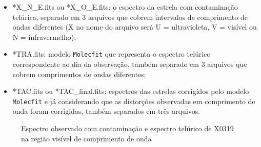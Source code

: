 \begin{itemize}
    \item *X\_N\_E.fits ou *X\_O\_E.fits: o espectro da estrela com contaminação telúrica, separado em 3 arquivos que cobrem intervalos de comprimento de ondas diferentes (X no nome do arquivo será U = ultravioleta, V = visível ou N = infravermelho);
    \item *TRA.fits: modelo \texttt{Molecfit} que representa o espectro telúrico correspondente ao dia da observação, também separado em 3 arquivos que cobrem comprimentos de ondas diferentes;
    \item *TAC.fits ou *TAC\_final.fits: espectros das estrelas corrigidos pelo modelo \texttt{Molecfit} e já considerando que as distorções observadas em comprimento de onda foram corrigidas, também separados em três arquivos.
\end{itemize}

\begin{figure}[htb]
  \centering
  \hfill
  \caption{Espectro observado com contaminação e espectro telúrico de X0319 na região visível de comprimento de onda}
  \label{fig:x0319-visible}
\end{figure}



